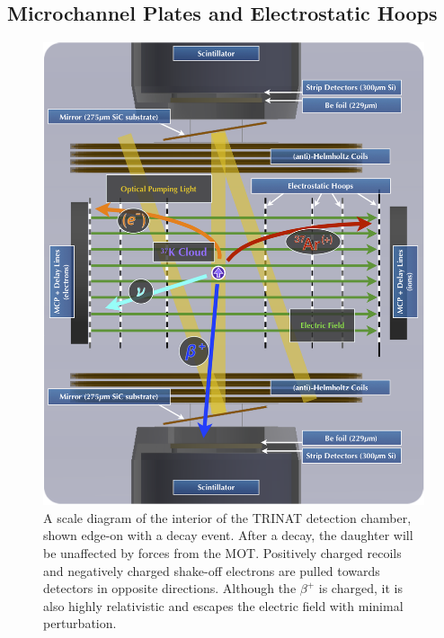 \subsection{Microchannel Plates and Electrostatic Hoops}
\label{section:mcps}

\begin{figure}[h!b!!t]
	\centering
	\includegraphics[width=.9\linewidth]{Figures/chamber_cross_section_with_event.png}
	\caption{A scale diagram of the interior of the TRINAT detection chamber, shown edge-on with a decay event. After a decay, the daughter will be unaffected by forces from the MOT.  Positively charged recoils and negatively charged shake-off electrons are pulled towards detectors in opposite directions.  Although the $\beta^+$ is charged, it is also highly relativistic and escapes the electric field with minimal perturbation.}
	\label{chamber_decayevent}
\end{figure}

